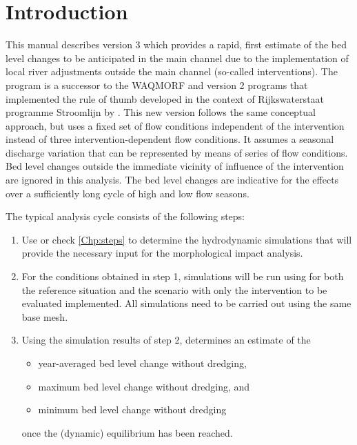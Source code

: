 \chapter{Introduction}

This manual describes \dfastmi version 3 which provides a rapid, first estimate of the bed level changes to be anticipated in the main channel due to the implementation of local river adjustments outside the main channel (so-called interventions).
The program is a successor to the WAQMORF and \dfastmi version 2 programs that implemented the rule of thumb developed in the context of Rijkswaterstaat programme Stroomlijn by \citet{Sieben2010}.
This new version follows the same conceptual approach, but uses a fixed set of flow conditions independent of the intervention instead of three intervention-dependent flow conditions.
It assumes a seasonal discharge variation that can be represented by means of series of flow conditions.
Bed level changes outside the immediate vicinity of influence of the intervention are ignored in this analysis.
The bed level changes are indicative for the effects over a sufficiently long cycle of high and low flow seasons.

The typical analysis cycle consists of the following steps:

\begin{enumerate}
\item Use \dfastmi or check \autoref{Chp:steps} to determine the hydrodynamic simulations that will provide the necessary input for the morphological impact analysis.

\item For the conditions obtained in step 1, simulations will be run using \dflowfm for both the reference situation and the scenario with only the intervention to be evaluated implemented.
All simulations need to be carried out using the same base mesh.

\item Using the simulation results of step 2, \dfastmi determines an estimate of the
\begin{itemize}
\item year-averaged bed level change \unitbrackets{\SI{}{\metre}} without dredging,
\item maximum bed level change \unitbrackets{\SI{}{\metre}} without dredging, and
\item minimum bed level change \unitbrackets{\SI{}{\metre}} without dredging
\end{itemize}
once the (dynamic) equilibrium has been reached.
\end{enumerate}

